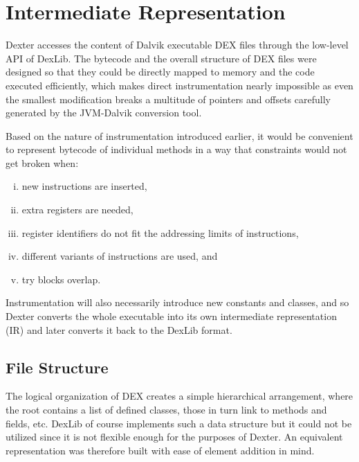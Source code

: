 \documentclass[12pt,twoside,notitlepage]{report}
\begin{document}
\section{Intermediate Representation}

Dexter accesses the content of Dalvik executable DEX files through the low-level API of DexLib. The bytecode and the overall structure of DEX files were designed so that they could be directly mapped to memory and the code executed efficiently, which makes direct instrumentation nearly impossible as even the smallest modification breaks a multitude of pointers and offsets carefully generated by the JVM-Dalvik conversion tool.

Based on the nature of instrumentation introduced earlier, it would be convenient to represent bytecode of individual methods in a way that constraints would not get broken when:
\begin{enumerate}[(i)]
\item new instructions are inserted,
\item extra registers are needed,
\item register identifiers do not fit the addressing limits of instructions,
\item different variants of instructions are used, and
\item try blocks overlap.
\end{enumerate}
Instrumentation will also necessarily introduce new constants and classes, and so Dexter converts the whole executable into its own intermediate representation (IR) and later converts it back to the DexLib format.

\subsection{File Structure}

The logical organization of DEX creates a simple hierarchical arrangement, where the root contains a list of defined classes, those in turn link to methods and fields, etc. DexLib of course implements such a data structure but it could not be utilized since it is not flexible enough for the purposes of Dexter. An equivalent representation was therefore built with ease of element addition in mind.

\end{document}
